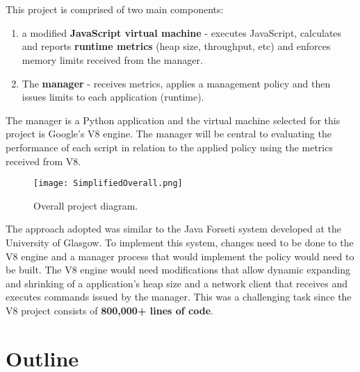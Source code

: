\documentclass{l4proj}
\begin{document}
\\\\
This project is comprised of two main components:
\begin{enumerate}
\item a modified \textbf{JavaScript virtual machine} - executes JavaScript, calculates and reports \textbf{runtime metrics} (heap size, throughput, etc) and enforces memory limits received from the manager.
\item The \textbf{manager} - receives metrics, applies a management policy and then issues limits to each application (runtime).
\end{enumerate}

The manager is a Python application and the virtual machine selected for this project is Google's V8 engine. The manager will be central to evaluating the performance of each script in relation to the applied policy using the metrics received from V8.

\begin{figure}[!ht]
  \centering
    \texttt{[image: SimplifiedOverall.png]}
    \caption{Overall project diagram.}
\end{figure}

The approach adopted was similar to the Java Forseti system developed at the University of Glasgow\cite{forseti}. To implement this system, changes need to be done to the V8 engine and a manager process that would implement the policy would need to be built. The V8 engine would need modifications that allow dynamic expanding and shrinking of a application's heap size and a network client that receives and executes commands issued by the manager. This was a challenging task since the V8 project consists of \textbf{800,000+ lines of code}. %

\section{Outline}
\end{document}
